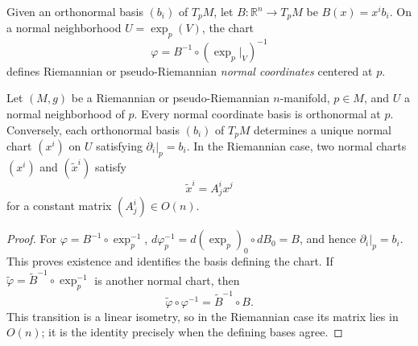Given an orthonormal basis $(b_i)$ of $T_pM$, let
$B:\mathbb R^n\to T_pM$ be $B(x)=x^ib_i$.  On a normal neighborhood
$U=\exp_p(V)$, the chart
\[
\varphi=B^{-1}\circ(\exp_p|_V)^{-1}
\]
defines Riemannian or pseudo-Riemannian \emph{normal coordinates} centered at
$p$.

\begin{proposition}
\label{prop:uniqueness-normal-coordinates}

Let $(M,g)$ be a Riemannian or pseudo-Riemannian $n$-manifold, $p\in M$, and
$U$ a normal neighborhood of $p$.  Every normal coordinate basis is
orthonormal at $p$.  Conversely, each orthonormal basis $(b_i)$ of $T_pM$
determines a unique normal chart $(x^i)$ on $U$ satisfying
$\partial_i|_p=b_i$.  In the Riemannian case, two normal charts $(x^i)$ and
$(\tilde x^i)$ satisfy
\begin{equation}
\tilde{x}^i = A^i_j x^j \tag{5.19}
\end{equation}
for a constant matrix $(A^i_j)\in O(n)$.

\begin{proof}
\sketch
For $\varphi=B^{-1}\circ\exp_p^{-1}$,
$d\varphi_p^{-1}=d(\exp_p)_0\circ dB_0=B$, and hence
$\partial_i|_p=b_i$.  This proves existence and identifies the basis defining
the chart.  If $\widetilde\varphi=\widetilde B^{-1}\circ\exp_p^{-1}$ is
another normal chart, then
\[
\widetilde\varphi\circ\varphi^{-1}=\widetilde B^{-1}\circ B.
\]
This transition is a linear isometry, so in the Riemannian case its matrix
lies in $O(n)$; it is the identity precisely when the defining bases agree.
\end{proof}
\end{proposition}

